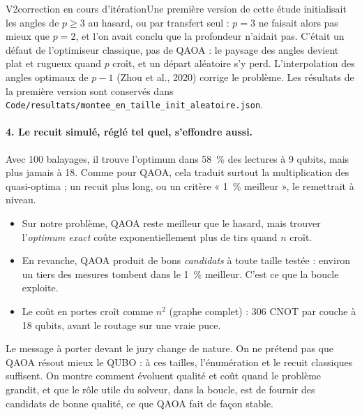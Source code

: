 \begin{evolution}{V2}{correction en cours d'itération}Une première version de cette étude initialisait les angles de $p\ge3$ au hasard, ou par transfert seul : $p=3$ ne faisait alors pas mieux que $p=2$, et l'on avait conclu que la profondeur n'aidait pas. C'était un défaut de l'optimiseur classique, pas de QAOA : le paysage des angles devient plat et rugueux quand $p$ croît, et un départ aléatoire s'y perd. L'interpolation des angles optimaux de $p-1$ (Zhou et al., 2020) corrige le problème. Les résultats de la première version sont conservés dans \texttt{Code/resultats/montee\_en\_taille\_init\_aleatoire.json}.\end{evolution}

\paragraph{4. Le recuit simulé, réglé tel quel, s'effondre aussi.} Avec 100 balayages, il trouve l'optimum dans 58~\% des lectures à 9 qubits, mais plus jamais à 18. Comme pour QAOA, cela traduit surtout la multiplication des quasi-optima ; un recuit plus long, ou un critère « 1~\% meilleur », le remettrait à niveau.

\begin{resultat}
\begin{itemize}
\item Sur notre problème, QAOA reste meilleur que le hasard, mais trouver l'\emph{optimum exact} coûte exponentiellement plus de tirs quand $n$ croît.
\item En revanche, QAOA produit de bons \emph{candidats} à toute taille testée : environ un tiers des mesures tombent dans le 1~\% meilleur. C'est ce que la boucle exploite.
\item Le coût en portes croît comme $n^2$ (graphe complet) : 306 CNOT par couche à 18 qubits, avant le routage sur une vraie puce.
\end{itemize}
\end{resultat}

\begin{projet}
Le message à porter devant le jury change de nature. On ne prétend pas que QAOA résout mieux le QUBO : à ces tailles, l'énumération et le recuit classiques suffisent. On montre comment évoluent qualité et coût quand le problème grandit, et que le rôle utile du solveur, dans la boucle, est de fournir des candidats de bonne qualité, ce que QAOA fait de façon stable.
\end{projet}

